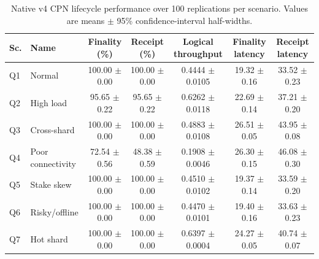 \begin{table}[pos=t]
\centering
\caption{Native v4 CPN lifecycle performance over 100 replications per scenario. Values are means $\pm$ 95\% confidence-interval half-widths.}
\label{tab:cpn_performance_native}
\scriptsize
\setlength{\tabcolsep}{3.2pt}
\renewcommand{\arraystretch}{1.10}
\begin{tabular}{llccccc}
\toprule
\textbf{Sc.} & \textbf{Name} & \textbf{Finality (\%)} & \textbf{Receipt (\%)} & \textbf{Logical throughput} & \textbf{Finality latency} & \textbf{Receipt latency}\\
\midrule
Q1 & Normal & 100.00 $\pm$ 0.00 & 100.00 $\pm$ 0.00 & 0.4444 $\pm$ 0.0105 & 19.32 $\pm$ 0.16 & 33.52 $\pm$ 0.23\\
Q2 & High load & 95.65 $\pm$ 0.22 & 95.65 $\pm$ 0.22 & 0.6262 $\pm$ 0.0118 & 22.69 $\pm$ 0.14 & 37.21 $\pm$ 0.20\\
Q3 & Cross-shard & 100.00 $\pm$ 0.00 & 100.00 $\pm$ 0.00 & 0.4883 $\pm$ 0.0108 & 26.51 $\pm$ 0.05 & 43.95 $\pm$ 0.08\\
Q4 & Poor connectivity & 72.54 $\pm$ 0.56 & 48.38 $\pm$ 0.59 & 0.1908 $\pm$ 0.0046 & 26.30 $\pm$ 0.15 & 46.08 $\pm$ 0.30\\
Q5 & Stake skew & 100.00 $\pm$ 0.00 & 100.00 $\pm$ 0.00 & 0.4510 $\pm$ 0.0102 & 19.37 $\pm$ 0.14 & 33.59 $\pm$ 0.20\\
Q6 & Risky/offline & 100.00 $\pm$ 0.00 & 100.00 $\pm$ 0.00 & 0.4470 $\pm$ 0.0101 & 19.40 $\pm$ 0.16 & 33.63 $\pm$ 0.23\\
Q7 & Hot shard & 100.00 $\pm$ 0.00 & 100.00 $\pm$ 0.00 & 0.6397 $\pm$ 0.0004 & 24.27 $\pm$ 0.05 & 40.74 $\pm$ 0.07\\
\bottomrule
\end{tabular}
\end{table}